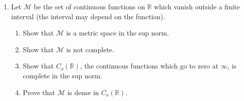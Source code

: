\documentclass{article}
\begin{document}
\begin{enumerate}
\begin{enumerate}
            \end{enumerate}
            \setcounter{enumi}{11}
      \item Let $\mathcal{M}$ be the set of continuous functions on $\mathbb{R}$
            which vanish outside a finite interval (the interval may depend on
            the function).
            \begin{enumerate}
                  \item Show that $\mathcal{M}$ is a metric space in the sup
                        norm.
                  \item Show that $\mathcal{M}$ is not complete.
                  \item Show that $C_o(\mathbb{R})$, the continuous functions
                        which go to zero at $\infty$, is complete in the sup
                        norm.
                  \item Prove that $\mathcal{M}$ is dense in $C_o(\mathbb{R})$.
            \end{enumerate}
\end{enumerate}
\end{document}
